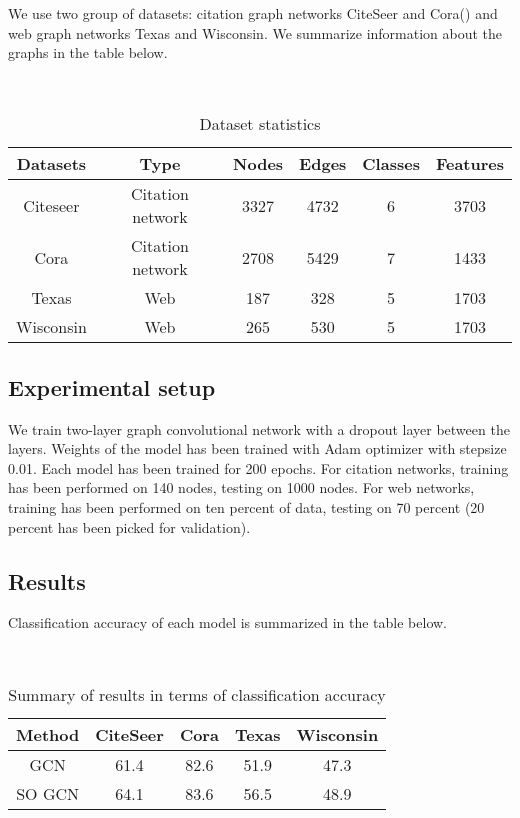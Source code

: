 \documentclass{article}
\begin{document}
We use two group of datasets: citation graph networks CiteSeer and Cora(\cite{Sen}) and web graph networks Texas and Wisconsin. We summarize information about the graphs in the table below.
\begin{table}[h]
\centering
\caption{Dataset statistics}
~\\
\begin{tabular}{c c c c c c}
{\bf Datasets} & {\bf Type} & {\bf Nodes} & {\bf Edges} & {\bf Classes} & {\bf Features}\\
\hline
Citeseer & Citation network & 3327 & 4732 & 6 & 3703\\
Cora & Citation network & 2708 & 5429 & 7 & 1433 \\
Texas & Web & 187 & 328 & 5 & 1703\\
Wisconsin & Web & 265 & 530 & 5 & 1703 \\
\end{tabular}
\end{table}

\subsection{Experimental setup}

We train two-layer graph convolutional network with a dropout layer between the layers. Weights of the model has been trained with Adam optimizer with stepsize 0.01. Each model has been trained for 200 epochs. For citation networks, training has been performed on 140 nodes, testing on 1000 nodes. For web networks, training has been performed on ten percent of data, testing on 70 percent (20 percent has been picked for validation).

\subsection{Results}

Classification accuracy of each model is summarized in the table below. 

\begin{table}[h]
\centering
\caption{Summary of results in terms of classification accuracy} 
~\\
\begin{tabular}{c c c c c}
{\bf Method} & {\bf CiteSeer} & {\bf Cora} & {\bf Texas} & {\bf Wisconsin}\\
\hline
GCN & 61.4 & 82.6 & 51.9 & 47.3\\
SO GCN & 64.1 & 83.6 & 56.5 & 48.9\\
\end{tabular}
\end{table}
\end{document}
